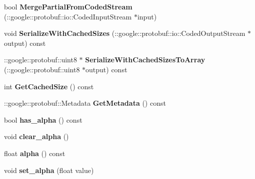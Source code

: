 \begin{DoxyCompactItemize}
bool {\bfseries Merge\+Partial\+From\+Coded\+Stream} (\+::google\+::protobuf\+::io\+::\+Coded\+Input\+Stream $\ast$input)
\item 
\mbox{\label{classcaffe_1_1_e_l_u_parameter_afa23c047597419a2b914fae75012b1e0}} 
void {\bfseries Serialize\+With\+Cached\+Sizes} (\+::google\+::protobuf\+::io\+::\+Coded\+Output\+Stream $\ast$output) const
\item 
\mbox{\label{classcaffe_1_1_e_l_u_parameter_a8f44d8392dcb42e1f5c9f17492169d7b}} 
\+::google\+::protobuf\+::uint8 $\ast$ {\bfseries Serialize\+With\+Cached\+Sizes\+To\+Array} (\+::google\+::protobuf\+::uint8 $\ast$output) const
\item 
\mbox{\label{classcaffe_1_1_e_l_u_parameter_a9addcbcb558ffdb55fff781ef3450948}} 
int {\bfseries Get\+Cached\+Size} () const
\item 
\mbox{\label{classcaffe_1_1_e_l_u_parameter_ab0319bcdd717952d06ff0f70da1c2065}} 
\+::google\+::protobuf\+::\+Metadata {\bfseries Get\+Metadata} () const
\item 
\mbox{\label{classcaffe_1_1_e_l_u_parameter_a31224a3109da33615df9787e525938cc}} 
bool {\bfseries has\+\_\+alpha} () const
\item 
\mbox{\label{classcaffe_1_1_e_l_u_parameter_a3dc6959363cb36881656ce22c396a373}} 
void {\bfseries clear\+\_\+alpha} ()
\item 
\mbox{\label{classcaffe_1_1_e_l_u_parameter_abfd2c5421b603591e4fec3355423771c}} 
float {\bfseries alpha} () const
\item 
\mbox{\label{classcaffe_1_1_e_l_u_parameter_a9b8ab7bf52e24e40528c99baab954ba6}} 
void {\bfseries set\+\_\+alpha} (float value)
\end{DoxyCompactItemize}
